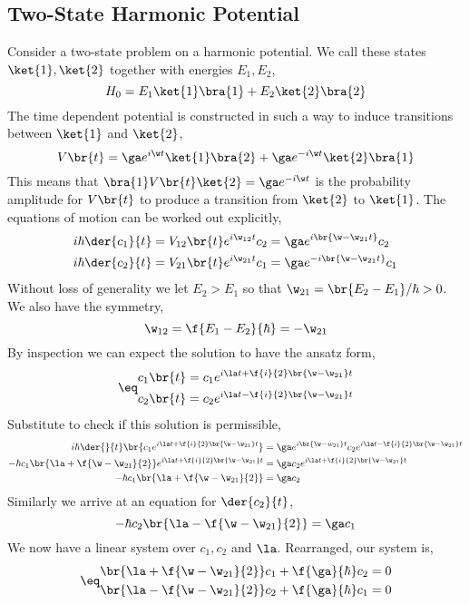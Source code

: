 \documentclass{article}
\begin{document}
\subsection{Two-State Harmonic Potential}
Consider a two-state problem on a harmonic potential. We call these states $\ket{1}, \ket{2}$ together with energies $E_1, E_2$,
\[ H_0 = E_1 \ket{1}\bra{1} + E_2 \ket{2}\bra{2}  \]
The time dependent potential is constructed in such a way to induce transitions between $\ket{1}$ and $\ket{2}$,
\[ V\br{t} = \ga e^{i \w t} \ket{1} \bra{2} + \ga e^{- i \w t} \ket{2}\bra{1} \]
This means that $\bra{1} V\br{t} \ket{2} = \ga e^{- i\w t}$ is the probability amplitude for $V\br{t}$ to produce a transition from $\ket{2}$ to $\ket{1}$. The equations of motion can be worked out explicitly,
\begin{align*}
    i \hbar \der{c_1}{t} &= V_{12}\br{t} e^{i \w_{12} t} c_2 = \ga e^{i\br{\w - \w_{21} t}}c_2 \\
    i \hbar \der{c_2}{t} &= V_{21}\br{t} e^{i \w_{21} t} c_1 = \ga e^{-i\br{\w - \w_{21} t}}c_1
\end{align*}
Without loss of generality we let $E_2 > E_1$ so that $\w_{21} = \br{E_2 - E_1}/ \hbar > 0$. We also have the symmetry,
\[ \w_{12} = \f{E_1 - E_2}{\hbar} = - \w_{21} \]
By inspection we can expect the solution to have the ansatz form,
\begin{align*}
\eq \label{eq:c1c2_twostate_perturb}
\begin{split}
c_1 \br{t} &= c_1 e^{i \la t + \f{i}{2} \br{\w - \w_{21}} t} \\
c_2 \br{t} &= c_2 e^{i \la t - \f{i}{2} \br{\w - \w_{21}} t}
\end{split}
\end{align*}
Substitute to check if this solution is permissible,
\begin{align*}
i \hbar \der{}{t} \br{c_1 e^{i \la t + \f{i}{2} \br{\w - \w_{21}} t}}
&= \ga e^{i \br{\w - w_{21}}t} c_2 e^{i \la t - \f{i}{2} \br{\w - \w_{21}} t} \\
- \hbar c_1 \br{\la + \f{\w - \w_{21}}{2}}e^{i \la t + \f{i}{2} \br{\w - \w_{21}} t} &= \ga c_2 e^{i \la t + \f{i}{2} \br{\w - \w_{21}} t} \\
- \hbar c_1 \br{\la + \f{\w - \w_{21}}{2}} &= \ga c_2
\end{align*}
Similarly we arrive at an equation for $\der{c_2}{t}$,
\[ - \hbar c_2 \br{\la - \f{\w - \w_{21}}{2}} = \ga c_1 \]
We now have a linear system over $c_1, c_2$ and $\la$. Rearranged, our system is,
\begin{align*}
\eq\label{eq:c10c20_perturb}
\begin{split}
\br{\la + \f{\w - \w_{21}}{2}} c_1 + \f{\ga}{\hbar} c_2 &= 0 \\
\br{\la - \f{\w - \w_{21}}{2}} c_2 + \f{\ga}{\hbar} c_1 &= 0
\end{split}
\end{align*}
\end{document}
